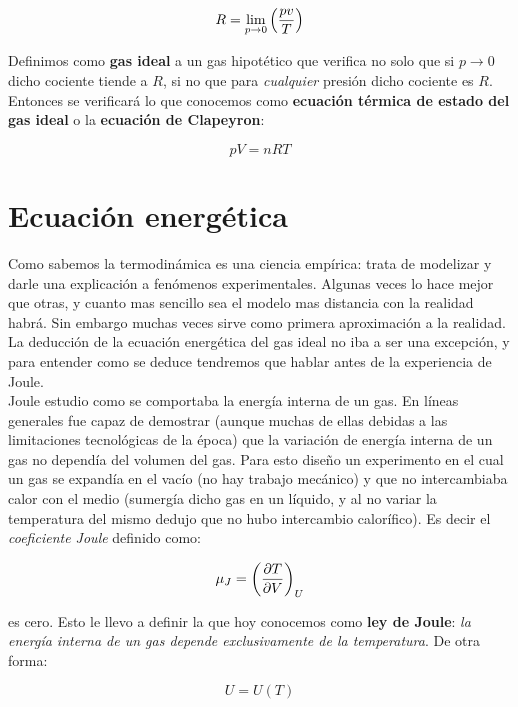 \documentclass[12pt,a4paper,oneside]{book}
\begin{document}
\begin{equation}
R = \lim_{p \rightarrow 0} \left( \dfrac{pv}{T} \right)
\end{equation}

Definimos como \textbf{gas ideal} a un gas hipotético que verifica no solo que si $p \rightarrow 0 $ dicho cociente tiende a $R$, si no que para \textit{cualquier} presión dicho cociente es $R$.  Entonces se verificará lo que conocemos como \textbf{ecuación térmica de estado del gas ideal} o la \textbf{ecuación de Clapeyron}:

\begin{equation}
pV = nRT
\end{equation}

\section{Ecuación energética}

Como sabemos la termodinámica es una ciencia empírica: trata de modelizar y darle una explicación a fenómenos experimentales. Algunas veces lo hace mejor que otras, y cuanto mas sencillo sea el modelo mas distancia con la realidad habrá. Sin embargo muchas veces sirve como primera aproximación a la realidad. La deducción de la ecuación energética del gas ideal no iba a ser una excepción, y para entender como se deduce tendremos que hablar antes de la experiencia de Joule. \\

Joule estudio como se comportaba la energía interna de un gas. En líneas generales fue capaz de demostrar (aunque muchas de ellas debidas a las limitaciones tecnológicas de la época) que la variación de energía interna de un gas no dependía del volumen del gas. Para esto diseño un experimento en el cual un gas se expandía en el vacío (no hay trabajo mecánico) y que no intercambiaba calor con el medio (sumergía dicho gas en un líquido, y al no variar la temperatura del mismo dedujo que no hubo intercambio calorífico). Es decir el \textit{coeficiente Joule} definido como:

\begin{equation}
\mu_J = \left( \frac{\partial T}{\partial V} \right)_U
\end{equation}

es cero. Esto le llevo a definir la que hoy conocemos como \textbf{ley de Joule}: \textit{la energía interna de un gas depende exclusivamente de la temperatura}. De otra forma:

\begin{equation}
U = U(T)
\end{equation}
\end{document}
